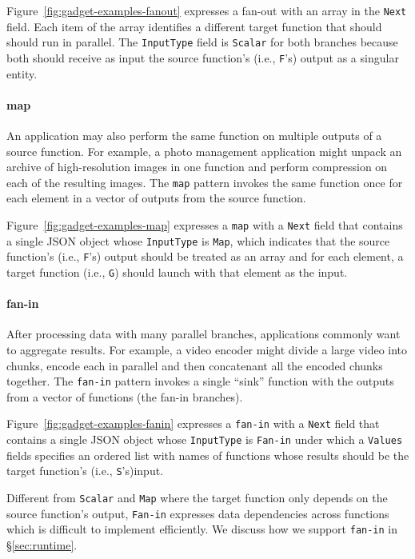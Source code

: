 Figure~\ref{fig:gadget-examples-fanout} expresses a fan-out with an array in
the \texttt{Next} field. Each item of the array identifies a different target
function that should should run in parallel. The \texttt{InputType} field is
\texttt{Scalar} for both branches because both should receive as input the
source function's (i.e., \texttt{F}'s) output as a singular entity.

\paragraph{map}

An application may also perform the same function on multiple outputs of a
source function. For example, a photo management application might unpack an
archive of high-resolution images in one function and perform compression on
each of the resulting images. The \texttt{map} pattern invokes the same
function once for each element in a vector of outputs from the source
function.

Figure~\ref{fig:gadget-examples-map} expresses a \texttt{map} with a
\texttt{Next} field that contains a single JSON object whose
\texttt{InputType} is \texttt{Map}, which indicates that the source function's
(i.e., \texttt{F}'s) output should be treated as an array and for each
element, a target function (i.e., \texttt{G}) should launch with that element
as the input.

\paragraph{fan-in}

After processing data with many parallel branches, applications commonly want
to aggregate results. For example, a video encoder might divide a large video
into chunks, encode each in parallel and then concatenant all the encoded
chunks together. The \texttt{fan-in} pattern invokes a single ``sink''
function with the outputs from a vector of functions (the fan-in branches).

Figure~\ref{fig:gadget-examples-fanin} expresses a \texttt{fan-in} with a
\texttt{Next} field that contains a single JSON object whose
\texttt{InputType} is \texttt{Fan-in} under which a \texttt{Values} fields
specifies an ordered list with names of functions whose results should be the
target function's (i.e., \texttt{S}'s)input.

Different from \texttt{Scalar} and \texttt{Map} where the target function only
depends on the source function's output, \texttt{Fan-in} expresses data
dependencies across functions which is difficult to implement efficiently. We
discuss how we support \texttt{fan-in} in \S\ref{sec:runtime}.

